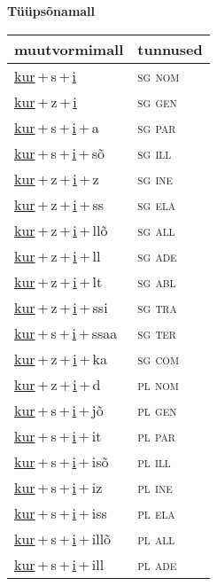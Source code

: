 
\vspace{1.8em}
\begin{minipage}{\textwidth}
\textbf{Tüüpsõnamall \,}\\

\begin{sideways}
\begin{tabular}{l l}
muutvormimall & tunnused \\
\hline
\underline{kur}\,+\,s\,+\,\underline{i} & \textsc{ sg nom } \\
\underline{kur}\,+\,z\,+\,\underline{i} & \textsc{ sg gen } \\
\underline{kur}\,+\,s\,+\,\underline{i}\,+\,a & \textsc{ sg par } \\
\underline{kur}\,+\,s\,+\,\underline{i}\,+\,sõ & \textsc{ sg ill } \\
\underline{kur}\,+\,z\,+\,\underline{i}\,+\,z & \textsc{ sg ine } \\
\underline{kur}\,+\,z\,+\,\underline{i}\,+\,ss & \textsc{ sg ela } \\
\underline{kur}\,+\,z\,+\,\underline{i}\,+\,llõ & \textsc{ sg all } \\
\underline{kur}\,+\,z\,+\,\underline{i}\,+\,ll & \textsc{ sg ade } \\
\underline{kur}\,+\,z\,+\,\underline{i}\,+\,lt & \textsc{ sg abl } \\
\underline{kur}\,+\,z\,+\,\underline{i}\,+\,ssi & \textsc{ sg tra } \\
\underline{kur}\,+\,s\,+\,\underline{i}\,+\,ssaa & \textsc{ sg ter } \\
\underline{kur}\,+\,z\,+\,\underline{i}\,+\,ka & \textsc{ sg com } \\
\underline{kur}\,+\,z\,+\,\underline{i}\,+\,d & \textsc{ pl nom } \\
\underline{kur}\,+\,s\,+\,\underline{i}\,+\,jõ & \textsc{ pl gen } \\
\underline{kur}\,+\,s\,+\,\underline{i}\,+\,it & \textsc{ pl par } \\
\underline{kur}\,+\,s\,+\,\underline{i}\,+\,isõ & \textsc{ pl ill } \\
\underline{kur}\,+\,s\,+\,\underline{i}\,+\,iz & \textsc{ pl ine } \\
\underline{kur}\,+\,s\,+\,\underline{i}\,+\,iss & \textsc{ pl ela } \\
\underline{kur}\,+\,s\,+\,\underline{i}\,+\,illõ & \textsc{ pl all } \\
\underline{kur}\,+\,s\,+\,\underline{i}\,+\,ill & \textsc{ pl ade } \\

\end{tabular}
\end{sideways}
\end{minipage}
